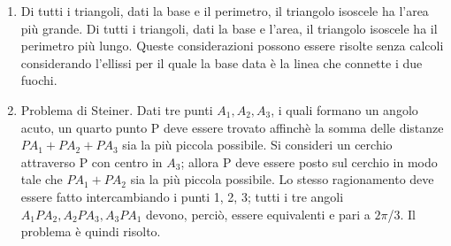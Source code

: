 \begin{enumerate}
 \item Di tutti i triangoli, dati la base e il perimetro, il triangolo isoscele ha l'area pi\`u grande. 
Di tutti i triangoli, dati la base e l'area, il triangolo isoscele ha il perimetro pi\`u lungo. Queste considerazioni 
possono essere risolte senza calcoli considerando l'ellissi per il quale la base data \`e la linea che 
connette i due fuochi. 
\item Problema di Steiner. Dati tre punti \begin{math}
                                           A_1, A_2, A_3
                                          \end{math}, i quali formano un angolo acuto, un quarto punto P deve 
essere trovato affinch\`e la somma delle distanze \begin{math}
                                                   PA_1 + PA_2 + PA_3
                                                  \end{math} sia la pi\`u piccola possibile. Si consideri un 
cerchio attraverso P con centro in \begin{math}
                                    A_3
                                   \end{math}; allora P deve essere posto sul cerchio in modo tale 
che \begin{math}
     PA_1 + PA_2
    \end{math} sia la pi\`u piccola possibile. Lo stesso ragionamento deve essere fatto intercambiando i 
punti 1, 2, 3; tutti i tre angoli \begin{math}
                                      A_1PA_2, A_2PA_3, A_3PA_1
                                     \end{math} devono, perci\`o, essere equivalenti e pari a 
\begin{math}
 2\pi
\end{math}/3. Il problema \`e quindi risolto.






\end{enumerate}

 
















                                                                                          











\ \